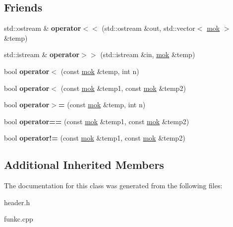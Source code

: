 \subsection*{Friends}
\begin{DoxyCompactItemize}
\item 
\mbox{\label{classmok_a2df4682ee60cba806ce6e9bc00b125df}} 
std\+::ostream \& {\bfseries operator$<$$<$} (std\+::ostream \&out, std\+::vector$<$ \mbox{\hyperlink{classmok}{mok}} $>$ \&temp)
\item 
\mbox{\label{classmok_a92d634b9eef4e650b03725538e37af6e}} 
std\+::istream \& {\bfseries operator$>$$>$} (std\+::istream \&in, \mbox{\hyperlink{classmok}{mok}} \&temp)
\item 
\mbox{\label{classmok_a1acc40ab2d30ad3d746a6dacab7281a7}} 
bool {\bfseries operator$<$} (const \mbox{\hyperlink{classmok}{mok}} \&temp, int n)
\item 
\mbox{\label{classmok_af974b38b6d11e94fc0cad25b0d618093}} 
bool {\bfseries operator$<$} (const \mbox{\hyperlink{classmok}{mok}} \&temp1, const \mbox{\hyperlink{classmok}{mok}} \&temp2)
\item 
\mbox{\label{classmok_a3d6d2db438ef513d36f8ca0ac9ee3f70}} 
bool {\bfseries operator$>$=} (const \mbox{\hyperlink{classmok}{mok}} \&temp, int n)
\item 
\mbox{\label{classmok_a41423565d8a86a90f067ac1b7d7de79a}} 
bool {\bfseries operator==} (const \mbox{\hyperlink{classmok}{mok}} \&temp1, const \mbox{\hyperlink{classmok}{mok}} \&temp2)
\item 
\mbox{\label{classmok_a6a2b4bc52c82419b273af2448e6e7d48}} 
bool {\bfseries operator!=} (const \mbox{\hyperlink{classmok}{mok}} \&temp1, const \mbox{\hyperlink{classmok}{mok}} \&temp2)
\end{DoxyCompactItemize}
\subsection*{Additional Inherited Members}


The documentation for this class was generated from the following files\+:\begin{DoxyCompactItemize}
\item 
header.\+h\item 
funkc.\+cpp\end{DoxyCompactItemize}
